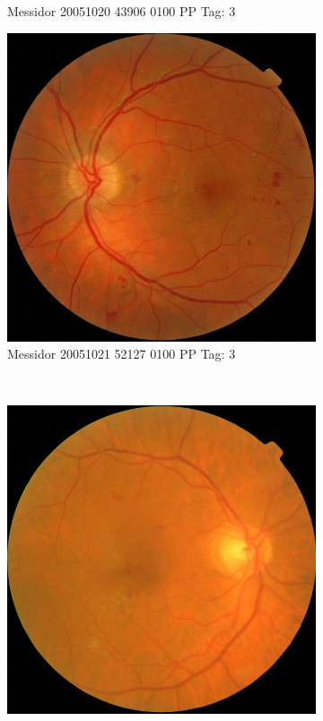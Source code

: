 \begin{figure}[ht!]
\begin{subfigure}[b]{0.4\textwidth}
		\caption{Messidor 20051020 43906 0100 PP Tag: 3}				
	\end{subfigure}	
	\begin{subfigure}[b]{0.4\textwidth}
		\centering
		\includegraphics[width=\textwidth]{Figures/chapter_stability/20051021_52127_0100_PP/20051021_52127_0100_PP.jpeg}
		\caption{Messidor 20051021 52127 0100 PP Tag: 3}				
	\end{subfigure}	~
	\begin{subfigure}[b]{0.4\textwidth}
		\centering
		\includegraphics[width=\textwidth]{Figures/chapter_stability/20060412_59717_0200_PP/20060412_59717_0200_PP.jpeg}

\end{subfigure}
\end{figure}
